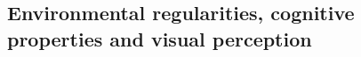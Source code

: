 \documentclass[12pt,english]{article}%
\newcommand{\citet}[1]{\textcite{#1}}
\newcommand{\seeFig}[1]{Figure~\ref{fig:#1}}
\newcommand{\AM}[1]{\textbf{\textcolor{blue}{[AM: #1]}}}
\begin{document}
\subsection{Environmental regularities, cognitive properties and visual perception}

\end{document}
